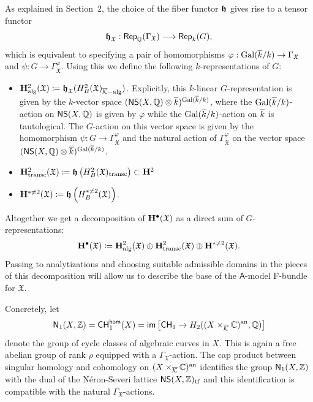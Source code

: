 \documentclass[twoside,leqno]{article}
\numberwithin{equation}{section}
\theoremstyle{plain}
\theoremstyle{definition}
\begin{document}
As explained in Section~2, the choice of the fiber functor $\boldsymbol{\mathfrak{h}}$ gives
rise to a tensor functor
\[
\boldsymbol{\mathfrak{h}}_{\mathfrak{X}} : \mathsf{Rep}_{\mathbb Q}(\Gamma_{\mathfrak{X}})
\longrightarrow \mathsf{Rep}_{k}(G),
\]
which is equivalent to specifying a pair of homomorphisms $\varphi :
\operatorname{Gal}(\overline{k}/k) \to \Gamma_{\mathfrak{X}}$ and \linebreak $\psi : G
\to \Gamma_{\mathfrak{X}}^{\varphi}$. 
Using this we define the following
$k$-representations of $G$:
\begin{itemize}
\item $\mathbf{H}^{2}_{\operatorname{alg}}(\mathfrak{X}) \coloneqq
  \boldsymbol{\mathfrak{h}}_{\mathfrak{X}}(H^{2}_{B}(\mathfrak{X})_{\overline{\mathcal K}-\operatorname{alg}})$.
  Explicitly, this $k$-linear
  $G$-representation is given by
  the $k$-vector space $(\mathsf{NS}(X,\mathbb Q)\otimes
  \overline{k})^{\operatorname{Gal}(\overline{k}/k)}$, where the $\operatorname{Gal}(\overline{k}/k)$-action on
  $\mathsf{NS}(X,\mathbb Q)$ is given by $\varphi$ while the
  $\operatorname{Gal}(\overline{k}/k)$-action on $\overline{k}$ is tautological. The $G$-action on
  this vector space is given by the homomorphism $\psi : G \to
  \Gamma_{\mathfrak{X}}^{\varphi}$ and the natural action of
  $\Gamma_{\mathfrak{X}}^{\varphi}$ on the vector space
  $(\mathsf{NS}(X,\mathbb Q)\otimes \overline{k})^{\operatorname{Gal}(\overline{k}/k)}$.
\item $\mathbf{H}^{2}_{\operatorname{transc}}(\mathfrak{X}) \coloneqq
  \boldsymbol{\mathfrak{h}}\left(H^{2}_{B}(\mathfrak{X})_{\operatorname{transc}}\right) \subset \mathbf{H}^{2}$
\item 
  $\mathbf{H}^{* \neq 2}(\mathfrak{X}) \coloneqq \boldsymbol{\mathfrak{h}}\left(H^{* \neq
  2}_{B}(\mathfrak{X})\right)$.
\end{itemize}

Altogether we get a decomposition of $\mathbf{H}^{\bullet}(\mathfrak{X})$ as a
direct sum of $G$-representations:
\begin{equation} \label{eq:WeilGdecomp}
\mathbf{H}^{\bullet}(\mathfrak{X}) \coloneqq
\mathbf{H}^{2}_{\operatorname{alg}}(\mathfrak{X})\oplus
\mathbf{H}^{2}_{\operatorname{transc}}(\mathfrak{X})\oplus \mathbf{H}^{* \neq
  2}(\mathfrak{X}).
\end{equation}
Passing to analytizations and choosing suitable admissible domains in
the pieces of this decomposition will allow us to describe the base of
the $\mathsf{A}$-model F-bundle for $\mathfrak{X}$.

\medskip

Concretely, let
\[
\mathsf{N}_{1}(X,\mathbb Z) = \mathsf{CH}^{\mathsf{hom}}_{1}(X) =
\mathsf{im} \left[ \mathsf{CH}_{1} \to
  H_{2}((X\times_{\overline{\mathcal K}} \mathbb C)^{\operatorname{an}},\mathbb Q)
  \right]
\]
denote the group of cycle classes of algebraic curves in $X$. This is
again a free abelian group of rank $\rho$ equipped with a
$\Gamma_{\mathfrak{X}}$-action.  The cap product between singular
homology and cohomology on $(X\times_{\overline{\mathcal K}}\mathbb C)^{\operatorname{an}}$ identifies the
group $\mathsf{N}_{1}(X,\mathbb Z)$ with the dual of the N\'{e}ron-Severi lattice
$\mathsf{NS}(X,\mathbb Z)_{\operatorname{tf}}$ and this identification is compatible
  with the natural $\Gamma_{\mathfrak{X}}$-actions.
\end{document}
